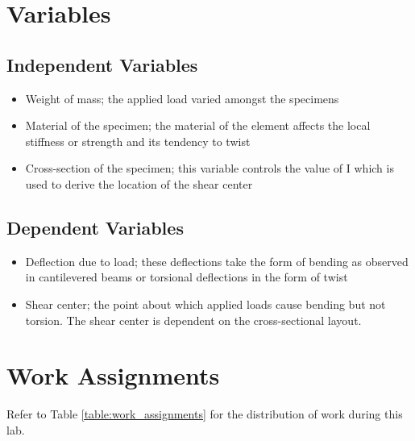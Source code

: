 \documentclass[12 pt]{report}
\begin{document}
\section{Variables} \label{variables}
\subsection{Independent Variables} \label{variables-independent_variables}
\begin{itemize}
	\item Weight of mass; the applied load varied amongst the specimens
	\item Material of the specimen; the material of the element affects the local stiffness or strength and its tendency to twist
	\item Cross-section of the specimen; this variable controls the value of I which is used to derive the location of the shear center 
\end{itemize}

\subsection{Dependent Variables} \label{variables-dependent_variables}
\begin{itemize}
	\item Deflection due to load; these deflections take the form of bending as observed in cantilevered beams or torsional deflections in the form of twist 
	\item Shear center; the point about which applied loads cause bending but not torsion. The shear center is dependent on the cross-sectional layout. 
\end{itemize}

\section{Work Assignments} \label{work_assignments}
Refer to Table \ref{table:work_assignments} for the distribution of work during this lab.
\end{document}
